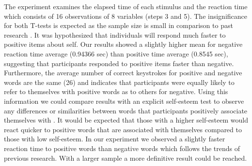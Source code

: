 \documentclass[11pt]{article}
\begin{document}
The experiment examines the elapsed time of each stimulus and the reaction time which consists of 16 observations of 8 variables (steps 3 and 5). 
The insignificance for both T-tests is expected as the sample size is small in comparison to past research \cite{greenwald_farnham_2000}. It was hypothesized that individuals will respond much faster to positive items about self. Our results showed a slightly higher mean for negative reaction time average (0.94366 sec) than positive time average (0.8545 sec), suggesting that participants responded to positive items faster than negative. Furthermore, the average number of correct keystrokes for positive and negative words are the same (26) and indicates that participants were equally likely to refer to themselves with positive words as to others for negative. Using this information we could compare results with an explicit self-esteem test to observe any differences or similarities between words that participants positively associate themselves with  \cite{greenwald_farnham_2000}. It would be expected that those with a higher self-esteem would react quicker to positive words that are associated with themselves compared to those with low self-esteem. In our experiment we observed a slightly faster reaction time to positive words than negative words which follows the trends of previous research. With a larger sample a more definitive result could be reached. 
\newpage



\end{document}
